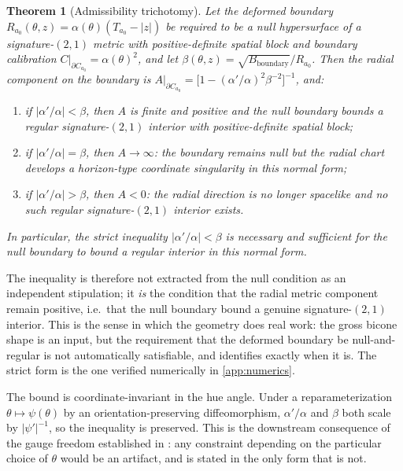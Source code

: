 \documentclass[preprint,12pt,authoryear]{elsarticle}
\theoremstyle{plain}
\newtheorem{theorem}{Theorem}[section]
\theoremstyle{definition}
\theoremstyle{remark}
\begin{document}
\begin{theorem}[Admissibility trichotomy]
\label{thm:admissibility}
Let the deformed boundary $R_{a_0}(\theta,z)=\alpha(\theta)(T_{a_0}-|z|)$ be required to be a null hypersurface of a signature-$(2,1)$ metric with positive-definite spatial block and boundary calibration $C|_{\partial C_{a_0}}=\alpha(\theta)^2$, and let $\beta(\theta,z)=\sqrt{B_{\mathrm{boundary}}}/R_{a_0}$. Then the radial component on the boundary is $A|_{\partial C_{a_0}}=\bigl[1-(\alpha'/\alpha)^2\beta^{-2}\bigr]^{-1}$, and:
\begin{enumerate}
\item[(i)] if $|\alpha'/\alpha|<\beta$, then $A$ is finite and positive
and the null boundary bounds a regular signature-$(2,1)$ interior with
positive-definite spatial block;
\item[(ii)] if $|\alpha'/\alpha|=\beta$, then $A\to\infty$: the boundary remains null but the radial chart develops a horizon-type coordinate singularity in this normal form;
\item[(iii)] if $|\alpha'/\alpha|>\beta$, then $A<0$: the radial direction
is no longer spacelike and no such regular signature-$(2,1)$ interior exists.
\end{enumerate}
In particular, the strict inequality $|\alpha'/\alpha|<\beta$ is necessary and sufficient for the null boundary to bound a regular interior in this normal form.
\end{theorem}

The inequality is therefore not extracted from the null condition as an independent stipulation; it \emph{is} the condition that the radial metric component remain positive, i.e.\ that the null boundary bound a genuine signature-$(2,1)$ interior. This is the sense in which the geometry does real work: the gross bicone shape is an input, but the requirement that the deformed boundary be null-and-regular is not automatically satisfiable, and  identifies exactly when it is. The strict form is the one verified numerically in \ref{app:numerics}.

The bound is coordinate-invariant in the hue angle. Under a reparameterization $\theta\mapsto\psi(\theta)$ by an orientation-preserving diffeomorphism, $\alpha'/\alpha$ and $\beta$ both scale by $|\psi'|^{-1}$, so the inequality is preserved. This is the downstream consequence of the gauge freedom established in : any constraint depending on the particular choice of $\theta$ would be an artifact, and  is stated in the only form that is not.
\end{document}
